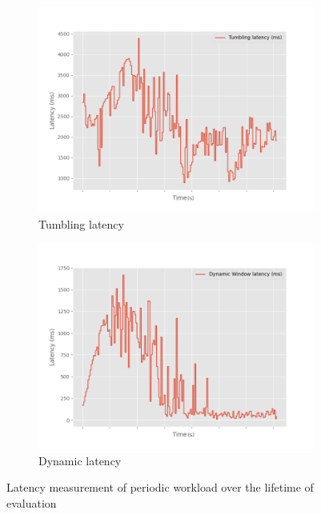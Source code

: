 \begin{figure}
    \begin{subfigure}[b]{0.5\columnwidth}
        \includegraphics[width=\columnwidth]{fig/periodic/Tumbling_latency_lineplot.png}
        \caption{Tumbling latency }
        \label{fig:periodic_tumbling_lineplot}
    \end{subfigure}
    \begin{subfigure}[b]{0.5\columnwidth}
        \includegraphics[width=\columnwidth]{fig/periodic/DynamicWindow_latency_lineplot.png}
        \caption{Dynamic latency }
        \label{fig:periodic_dynamic_lineplot}
    \end{subfigure}
    \caption{Latency measurement of periodic workload over the lifetime of evaluation}
    \label{fig:periodic_latency_lineplot}
\end{figure}


